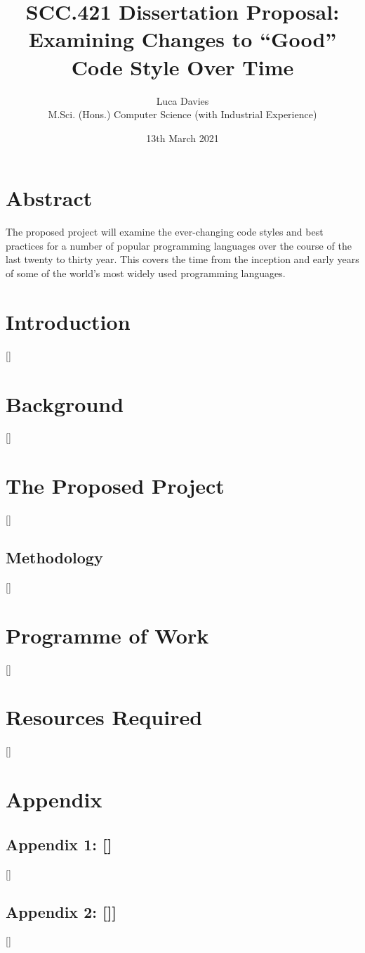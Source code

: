 \documentclass{article}
\title{\textbf{SCC.421 Dissertation Proposal: \\ Examining Changes to ``Good'' Code Style Over Time}}
\author{
Luca Davies \\ M.Sci. (Hons.) Computer Science (with Industrial Experience)}
\date{13th March 2021}
\begin{document}
\maketitle

\newpage
\section*{Abstract}
    The proposed project will examine the ever-changing code styles and best practices for a number of popular programming languages over the course of the last  twenty to thirty year. This covers the time from the inception and early years of some of the world's most widely used programming languages.
    \newline


\section{Introduction}
    []
\section{Background}
    []
\section{The Proposed Project}
    []
    \subsection{Methodology}
        []
\section{Programme of Work}
    []
\section{Resources Required}
    []

\newpage
\section*{Appendix}
    \subsection*{Appendix 1: []}
        []
    \subsection*{Appendix 2: []]}
        []
\end{document}
